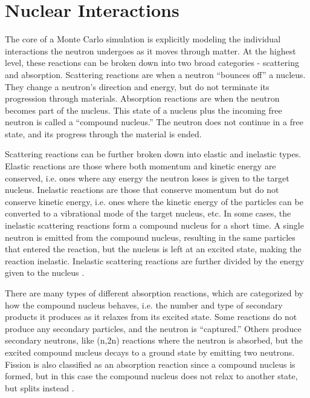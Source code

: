 \section{Nuclear Interactions}
\label{subsec:interactions}

The core of a Monte Carlo simulation is explicitly modeling the individual interactions the neutron undergoes as it moves through matter.  At the highest level, these reactions can be broken down into two broad categories - scattering and absorption.  Scattering reactions are when a neutron ``bounces off'' a nucleus.  They change a neutron's direction and energy, but do not terminate its progression through materials.  Absorption reactions are when the neutron becomes part of the nucleus.  This state of a nucleus plus the incoming free neutron is called a ``compound nucleus.''  The neutron does not continue in a free state, and its progress through the material is ended.

Scattering reactions can be further broken down into elastic and inelastic types.  Elastic reactions are those where both momentum and kinetic energy are conserved, i.e. ones where any energy the neutron loses is given to the target nucleus.  Inelastic reactions are those that conserve momentum but do not conserve kinetic energy, i.e. ones where the kinetic energy of the particles can be converted to a vibrational mode of the target nucleus, etc.  In some cases, the inelastic scattering reactions form a compound nucleus for a short time.  A single neutron is emitted from the compound nucleus, resulting in the same particles that entered the reaction, but the nucleus is left at an excited state, making the reaction inelastic.  Inelastic scattering reactions are further divided by the energy given to the nucleus \cite{duderstadt}.  

There are many types of different absorption reactions, which are categorized by how the compound nucleus behaves, i.e. the number and type of secondary products it produces as it relaxes from its excited state.  Some reactions do not produce any secondary particles, and the neutron is ``captured.''  Others produce secondary neutrons, like (n,2n) reactions where the neutron is absorbed, but the excited compound nucleus decays to a ground state by emitting two neutrons.  Fission is also classified as an absorption reaction since a compound nucleus is formed, but in this case the compound nucleus does not relax to another state, but splits instead \cite{duderstadt}. 

